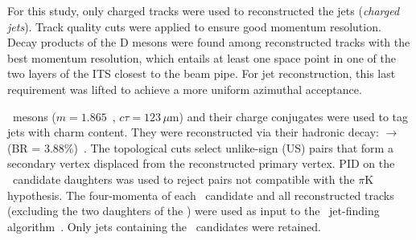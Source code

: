 \documentclass[a4paper]{jpconf}
\begin{document}
For this study, only charged tracks were used to reconstructed the jets (\emph{charged jets}).
Track quality cuts were applied to ensure good momentum resolution. 
Decay products of the D mesons were found among reconstructed tracks with the best momentum resolution, which entails at least one space
point in one of the two layers of the ITS closest to the beam pipe.
For jet reconstruction, this last requirement was lifted to achieve a more uniform azimuthal acceptance.

\Dzero\ mesons ($m=1.865$~\GeVcsq, $c\tau=123\,\mu$m) and their charge conjugates were used to tag jets with charm content.
They were reconstructed via their hadronic decay: \Dzero $\rightarrow$ \pip \kam (BR = 3.88\%)~\cite{PDG:2014}. 
The topological cuts select unlike-sign (US) pairs that form a secondary vertex displaced from the reconstructed
primary vertex. PID on the \Dzero\ candidate daughters was used to reject pairs not compatible with the $\pi$K hypothesis.
The four-momenta of each \Dzero\ candidate and all reconstructed tracks
(excluding the two daughters of the \Dzero) were used as input to the \antikt\ jet-finding algorithm~\cite{Cacciari:2008c}.
Only jets containing the \Dzero\ candidates were retained.
\end{document}
